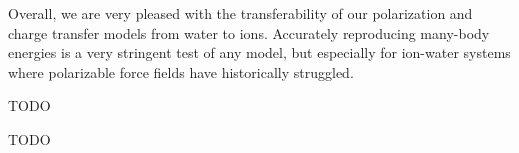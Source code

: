 \documentclass[journal=jacsat,manuscript=article]{achemso}
\begin{document}
Overall, we are very pleased with the transferability of our polarization and charge transfer models
from water to ions. Accurately reproducing many-body energies is a very stringent test of
any model, but especially for ion-water systems where polarizable force fields have
historically struggled.

\begin{acknowledgement}

TODO

\end{acknowledgement}

\begin{suppinfo}

TODO

\end{suppinfo}


\end{document}
